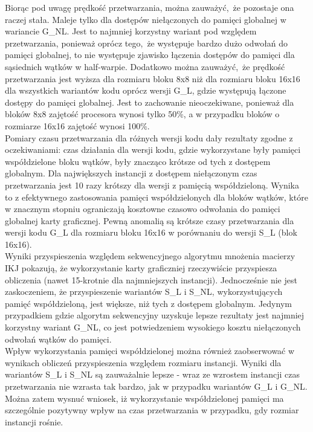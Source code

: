 \documentclass[10pt,a4paper]{article}
\begin{document}
Biorąc pod uwagę prędkość przetwarzania, można zauważyć, że pozostaje ona raczej stała. Maleje tylko dla dostępów niełączonych 
do pamięci globalnej w wariancie G\_NL. Jest to najmniej korzystny wariant pod względem przetwarzania, ponieważ 
oprócz tego, że występuje bardzo dużo odwołań do pamięci globalnej, to nie występuje zjawisko łączenia dostępów do pamięci
dla sąsiednich wątków w half-warpie. Dodatkowo można zauważyć, że prędkość przetwarzania 
jest wyższa dla rozmiaru bloku 8x8 niż dla rozmiaru bloku 16x16 dla wszystkich wariantów kodu 
oprócz wersji G\_L, gdzie występują łączone dostępy do pamięci globalnej. Jest to zachowanie 
nieoczekiwane, ponieważ dla bloków 8x8 zajętość procesora wynosi tylko 50\%, a w przypadku bloków o 
rozmiarze 16x16 zajętość wynosi 100\%. \\ 

Pomiary czasu przetwarzania dla różnych wersji kodu dały rezultaty zgodne z oczekiwaniami: 
czas działania dla wersji kodu, gdzie wykorzystane były pamięci współdzielone bloku wątków, 
były znacząco krótsze od tych z dostępem globalnym. Dla największych instancji z dostępem 
niełączonym czas przetwarzania jest 10 razy krótszy dla wersji z pamięcią współdzieloną.
Wynika to z efektywnego zastosowania pamięci współdzielonych dla bloków wątków, które w 
znacznym stopniu ograniczają kosztowne czasowo odwołania do pamięci globalnej karty graficznej.
Pewną anomalią są krótsze czasy przetwarzania dla wersji kodu G\_L dla rozmiaru bloku 16x16
w porównaniu do wersji S\_L (blok 16x16). \\

Wyniki przyspieszenia względem sekwencyjnego algorytmu mnożenia macierzy IKJ pokazują, że 
wykorzystanie karty graficzniej rzeczywiście przyspiesza obliczenia (nawet 15-krotnie dla 
najmniejszych instancji). Jednocześnie nie jest zaskoczeniem, że przyspieszenie wariantów
S\_L i S\_NL, wykorzystujących pamięć współdzieloną, jest większe, niż tych z dostępem 
globalnym. Jedynym przypadkiem gdzie algorytm sekwencyjny uzyskuje lepsze
rezultaty jest najmniej korzystny wariant G\_NL, co jest potwiedzeniem wysokiego kosztu
niełączonych odwołań wątków do pamięci. \\

Wpływ wykorzystania pamięci współdzielonej można również zaobserwować w wynikach obliczeń 
przyspieszenia względem rozmiaru instancji. Wyniki dla wariantów S\_L i S\_NL są zauważalnie 
lepsze - wraz ze wzrostem instancji czas przetwarzania nie wzrasta tak bardzo, jak w przypadku
wariantów G\_L i G\_NL. Można zatem wysnuć wniosek, iż wykorzystanie współdzielonej pamięci
ma szczególnie pozytywny wpływ na czas przetwarzania w przypadku, gdy rozmiar instancji rośnie. \\
\end{document}
